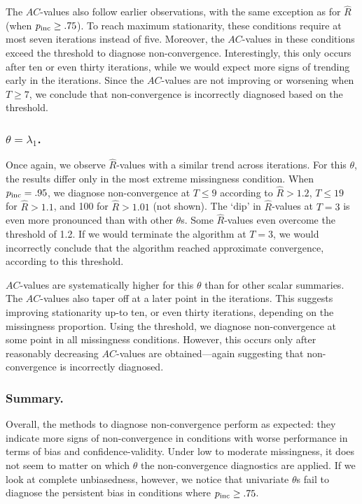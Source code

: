 \documentclass[Royal,times,sageh]{sagej}
\begin{document}
The \(AC\)-values also follow earlier observations, with the same exception as for \(\widehat{R}\) (when \(p_{\rm inc}\geq.75\)). To reach maximum stationarity, these conditions require at most seven iterations instead of five. Moreover, the \(AC\)-values in these conditions exceed the threshold to diagnose non-convergence. Interestingly, this only occurs after ten or even thirty iterations, while we would expect more signs of trending early in the iterations. Since the \(AC\)-values are not improving or worsening when \(T\geq7\), we conclude that non-convergence is incorrectly diagnosed based on the threshold.

\hypertarget{thetalambda_1.}{%
\subsubsection{\texorpdfstring{\(\theta=\lambda_{1}\).}{\textbackslash theta=\textbackslash lambda\_\{1\}.}}\label{thetalambda_1.}}

Once again, we observe \(\widehat{R}\)-values with a similar trend across iterations. For this \(\theta\), the results differ only in the most extreme missingness condition. When \(p_{\rm inc}=.95\), we diagnose non-convergence at \(T\leq9\) according to \(\widehat{R}>1.2\), \(T\leq19\) for \(\widehat{R}>1.1\), and 100 for \(\widehat{R}>1.01\) (not shown). The `dip' in \(\widehat{R}\)-values at \(T=3\) is even more pronounced than with other \(\theta\)s. Some \(\widehat{R}\)-values even overcome the threshold of 1.2. If we would terminate the algorithm at \(T=3\), we would incorrectly conclude that the algorithm reached approximate convergence, according to this threshold.

\(AC\)-values are systematically higher for this \(\theta\) than for other scalar summaries. The \(AC\)-values also taper off at a later point in the iterations. This suggests improving stationarity up-to ten, or even thirty iterations, depending on the missingness proportion. Using the threshold, we diagnose non-convergence at some point in all missingness conditions. However, this occurs only after reasonably decreasing \(AC\)-values are obtained---again suggesting that non-convergence is incorrectly diagnosed.

\hypertarget{summary.-1}{%
\subsubsection{Summary.}\label{summary.-1}}

Overall, the methods to diagnose non-convergence perform as expected: they indicate more signs of non-convergence in conditions with worse performance in terms of bias and confidence-validity. Under low to moderate missingness, it does not seem to matter on which \(\theta\) the non-convergence diagnostics are applied. If we look at complete unbiasedness, however, we notice that univariate \(\theta\)s fail to diagnose the persistent bias in conditions where \(p_{\rm inc}\geq.75\).
\end{document}
